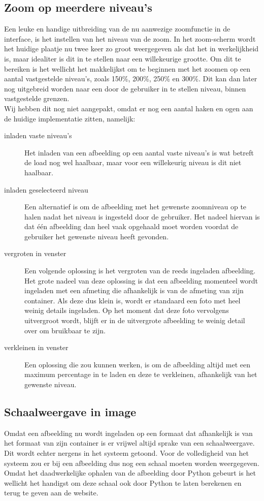 \subsection{Zoom op meerdere niveau's}
Een leuke en handige uitbreiding van de nu aanwezige zoomfunctie in de interface, is het instellen van het niveau van de zoom.
In het zoom-scherm wordt het huidige plaatje nu twee keer zo groot weergegeven als dat het in werkelijkheid is, maar idealiter is dit in te stellen naar een willekeurige grootte.
Om dit te bereiken is het wellicht het makkelijkst om te beginnen met het zoomen op een aantal vastgestelde niveau's, zoals 150\%, 200\%, 250\% en 300\%.
Dit kan dan later nog uitgebreid worden naar een door de gebruiker in te stellen niveau, binnen vastgestelde grenzen.
\\
Wij hebben dit nog niet aangepakt, omdat er nog een aantal haken en ogen aan de huidige implementatie zitten, namelijk:
\begin{description}
	\item[inladen vaste niveau's] Het inladen van een afbeelding op een aantal vaste niveau's is wat betreft de load nog wel haalbaar, maar voor een willekeurig niveau is dit niet haalbaar.
	\item[inladen geselecteerd niveau] Een alternatief is om de afbeelding met het gewenste zoomniveau op te halen nadat het niveau is ingesteld door de gebruiker.
	Het nadeel hiervan is dat \'{e}\'{e}n afbeelding dan heel vaak opgehaald moet worden voordat de gebruiker het gewenste niveau heeft gevonden.
	\item[vergroten in venster] Een volgende oplossing is het vergroten van de reeds ingeladen afbeelding.
	Het grote nadeel van deze oplossing is dat een afbeelding momenteel wordt ingeladen met een afmeting die afhankelijk is van de afmeting van zijn container.
Als deze dus klein is, wordt er standaard een foto met heel weinig details ingeladen.
Op het moment dat deze foto vervolgens uitvergroot wordt, blijft er in de uitvergrote afbeelding te weinig detail over om bruikbaar te zijn.
	\item[verkleinen in venster] Een oplossing die zou kunnen werken, is om de afbeelding altijd met een maximum percentage in te laden  en deze te verkleinen, afhankelijk van het gewenste niveau.
\end{description}

\subsection{Schaalweergave in image}
Omdat een afbeelding nu wordt ingeladen op een formaat dat afhankelijk is van het formaat van zijn container is er vrijwel altijd sprake van een schaalweergave.
Dit wordt echter nergens in het systeem getoond.
Voor de volledigheid van het systeem zou er  bij een afbeelding dus nog een schaal moeten worden weergegeven.
Omdat het daadwerkelijke ophalen van de afbeelding door Python gebeurt is het wellicht het handigst om deze schaal ook door Python te laten berekenen en terug te geven aan de website.

